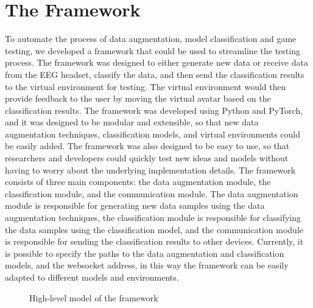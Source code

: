 \section{The Framework}
To automate the process of data augmentation, model classification and game testing, we developed a framework that could be used to streamline the testing process.
The framework was designed to either generate new data or receive data from the EEG headset, classify the data, and then send the classification results to the virtual environment for testing.
The virtual environment would then provide feedback to the user by moving the virtual avatar based on the classification results.
The framework was developed using Python and PyTorch, and it was designed to be modular and extensible, so that new data augmentation techniques, classification models, and virtual environments could be easily added.
The framework was also designed to be easy to use, so that researchers and developers could quickly test new ideas and models without having to worry about the underlying implementation details.
The framework consists of three main components: the data augmentation module, the classification module, and the communication module.
The data augmentation module is responsible for generating new data samples using the data augmentation techniques, the classification module is responsible for classifying the data samples using the classification model, and the communication module is responsible for sending the classification results to other devices.
Currently, it is possible to specify the paths to the data augmentation and classification models, and the websocket address, in this way the framework can be easily adapted to different models and environments.

\begin{figure}[!htbp]
    \centering
\caption{High-level model of the framework}
\label{fig:framework}
\end{figure}

